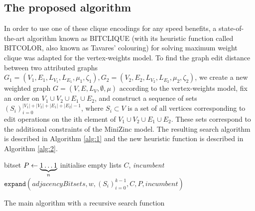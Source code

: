 \documentclass{article}
\theoremstyle{definition}
\begin{document}
\subsection{The proposed algorithm}
\label{sec:alg}
In order to use one of these clique encodings for any speed benefits, a state-of-the-art algorithm known as BITCLIQUE \cite{DBLP:phd/hal/tavares16} (with its heuristic function called BITCOLOR, also known as Tavares' colouring) for solving maximum weight clique was adapted for the vertex-weights model. To find the graph edit distance between two attributed graphs $G_1 = (V_1, E_1, L_{V_1}, L_{E_1}, \mu_1, \zeta_1), G_2 = (V_2, E_2, L_{V_2}, L_{E_2}, \mu_2, \zeta_2)$, we create a new weighted graph $G = (V, E, L_V, \emptyset, \mu)$ according to the vertex-weights model, fix an order on $V_1 \cup V_2 \cup E_1 \cup E_2$, and construct a sequence of sets $(S_i)_{i=0}^{|V_1|+|V_2|+|E_1|+|E_2|-1}$, where $S_i \subset V$ is a set of all vertices corresponding to edit operations on the ith element of $V_1 \cup V_2 \cup E_1 \cup E_2$. These sets correspond to the additional constraints of the MiniZinc model. The resulting search algorithm is described in Algorithm \ref{alg:1} and the new heuristic function is described in Algorithm \ref{alg:2}.
\begin{algorithm}
  bitset $P \gets \underbrace{1\dots1}_{\mathclap{n}}$\;
  initialise empty lists $C$, \textit{incumbent}\;
  $\mathtt{expand}(\mathit{adjacencyBitsets}, w, (S_i)_{i=0}^{k-1}, C, P, \mathit{incumbent})$\;
  \;
  \caption{The main algorithm with a recursive search function}
  \label{alg:1}
\end{algorithm}
\end{document}
